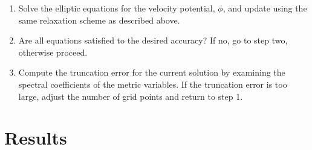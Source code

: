 \begin{enumerate}
\item Solve the elliptic equations for the velocity potential, $\phi$,
  and update using the same relaxation scheme as described above.

\item Are all equations satisfied to the desired accuracy? If no, go
  to step two, otherwise proceed.

\item Compute the truncation error for the current solution by
  examining the spectral coefficients of the metric variables. If the
  truncation error is too large, adjust the number of grid points and
  return to step 1.

\end{enumerate}

\section{Results}




